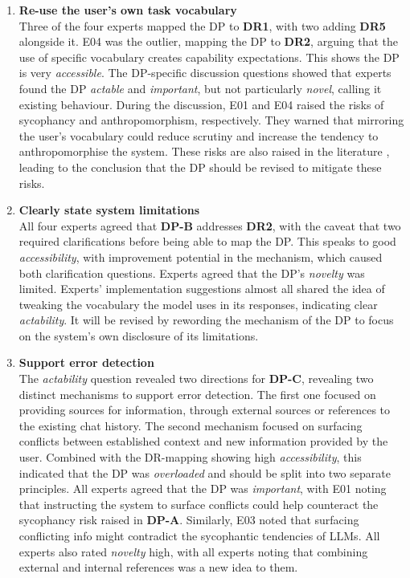 \begin{enumerate}[label=\textbf{DP-\Alph*}, leftmargin=*]
    \item \textbf{Re-use the user's own task vocabulary} \\
        Three of the four experts mapped the \ac{DP} to \textbf{DR1}, with two adding \textbf{DR5} alongside it. E04 was the outlier, mapping the \ac{DP} to \textbf{DR2}, arguing that the use of specific vocabulary creates capability expectations. This shows the \ac{DP} is very \textit{accessible}.
        The \ac{DP}-specific discussion questions showed that experts found the \ac{DP} \textit{actable} and \textit{important}, but not particularly \textit{novel}, calling it existing behaviour. During the discussion, E01 and E04 raised the risks of sycophancy and anthropomorphism, respectively. They warned that mirroring the user’s vocabulary could reduce scrutiny and increase the tendency to anthropomorphise the system. These risks are also raised in the literature \parencite{Sharma2024, Colombatto2025}, leading to the conclusion that the \ac{DP} should be revised to mitigate these risks.

    \item \textbf{Clearly state system limitations} \\
        All four experts agreed that \textbf{DP-B} addresses \textbf{DR2}, with the caveat that two required clarifications before being able to map the \ac{DP}. This speaks to good \textit{accessibility}, with improvement potential in the mechanism, which caused both clarification questions. Experts agreed that the \ac{DP}'s \textit{novelty} was limited. Experts' implementation suggestions almost all shared the idea of tweaking the vocabulary the model uses in its responses, indicating clear \textit{actability}. It will be revised by rewording the mechanism of the \ac{DP} to focus on the system's own disclosure of its limitations.

    \item \textbf{Support error detection} \\
        The \textit{actability} question revealed two directions for \textbf{DP-C}, revealing two distinct mechanisms to support error detection. The first one focused on providing sources for information, through external sources or references to the existing chat history. The second mechanism focused on surfacing conflicts between established context and new information provided by the user. Combined with the \ac{DR}-mapping showing high \textit{accessibility}, this indicated that the \ac{DP} was \textit{overloaded} and should be split into two separate principles. All experts agreed that the \ac{DP} was \textit{important}, with E01 noting that instructing the system to surface conflicts could help counteract the sycophancy risk raised in \textbf{DP-A}. Similarly, E03 noted that surfacing conflicting info might contradict the sycophantic tendencies of \acp{LLM}. All experts also rated \textit{novelty} high, with all experts noting that combining external and internal references was a new idea to them.


\end{enumerate}
